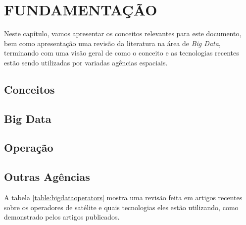 
\chapter{FUNDAMENTAÇÃO}

Neste capítulo, vamos apresentar os conceitos relevantes para este documento, bem como apresentação uma revisão da literatura na área de \textit{Big Data}, terminando com uma visão geral de como o conceito e as tecnologias recentes estão sendo utilizadas por variadas agências espaciais.

\section{Conceitos}

\section{Big Data}

\section{Operação}

\section{Outras Agências}

A tabela \ref{table:bigdataoperators} mostra uma revisão feita em artigos recentes sobre os operadores de satélite e quais tecnologias eles estão utilizando, como demonstrado pelos artigos publicados.

